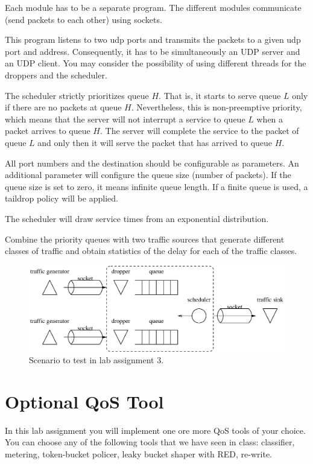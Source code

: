 Each module has to be a separate program. The different modules communicate (send packets to each other) using sockets.

This program listens to two udp ports and transmits the packets to a given udp port and address. Consequently, it has to be simultaneously an UDP server and an UDP client. You may consider the possibility of using different threads for the droppers and the scheduler.

The scheduler strictly prioritizes queue $H$.
That is, it starts to serve queue $L$ only if there are no packets at queue $H$.
Nevertheless, this is non-preemptive priority, which means that the server will not interrupt a service to queue $L$ when a packet arrives to queue $H$.
The server will complete the service to the packet of queue $L$ and only then it will serve the packet that has arrived to queue $H$.

All port numbers and the destination should be configurable as parameters. An additional parameter will configure the queue size (number of packets). If the queue size is set to zero, it means infinite queue length. If a finite queue is used, a taildrop policy will be applied.

The scheduler will draw service times from an exponential distribution.

Combine the priority queues with two traffic sources that generate different classes of traffic and obtain statistics of the delay for each of the traffic classes.

\begin{figure}[!h]
\centering
\includegraphics[width=\linewidth]{figures/scenario3.eps}
\caption{Scenario to test in lab assignment 3.}
\label{fig:scenario3}
\end{figure}

\section{Optional QoS Tool}

In this lab assignment you will implement one ore more QoS tools of your choice.
You can choose any of the following tools that we have seen in class: classifier, metering, token-bucket policer, leaky bucket shaper with RED, re-write.

